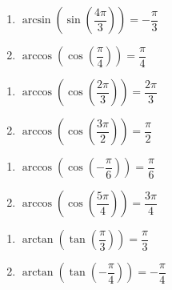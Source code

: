 \begin{multicols}{2}

\begin{enumerate}

\setcounter{enumi}{\value{HW}}

\item  $\arcsin\left(\sin\left(\dfrac{4\pi}{3}\right) \right) = -\dfrac{\pi}{3}$
\item  $\arccos\left(\cos\left(\dfrac{\pi}{4}\right) \right) = \dfrac{\pi}{4}$ 

\setcounter{HW}{\value{enumi}}

\end{enumerate}

\end{multicols}

\begin{multicols}{2}

\begin{enumerate}

\setcounter{enumi}{\value{HW}}

\item  $\arccos\left(\cos\left(\dfrac{2\pi}{3}\right) \right) = \dfrac{2\pi}{3}$
\item  $\arccos\left(\cos\left(\dfrac{3\pi}{2}\right) \right) = \dfrac{\pi}{2}$

\setcounter{HW}{\value{enumi}}

\end{enumerate}

\end{multicols}

\begin{multicols}{2}

\begin{enumerate}

\setcounter{enumi}{\value{HW}}

\item  $\arccos\left(\cos\left(-\dfrac{\pi}{6}\right) \right) = \dfrac{\pi}{6}$ 
\item  $\arccos\left(\cos\left(\dfrac{5\pi}{4}\right) \right) = \dfrac{3\pi}{4}$

\setcounter{HW}{\value{enumi}}

\end{enumerate}

\end{multicols}

\begin{multicols}{2}

\begin{enumerate}

\setcounter{enumi}{\value{HW}}

\item  $\arctan\left(\tan\left(\dfrac{\pi}{3}\right) \right) = \dfrac{\pi}{3}$
\item  $\arctan\left(\tan\left(-\dfrac{\pi}{4}\right) \right) = -\dfrac{\pi}{4}$

\setcounter{HW}{\value{enumi}}

\end{enumerate}

\end{multicols}

